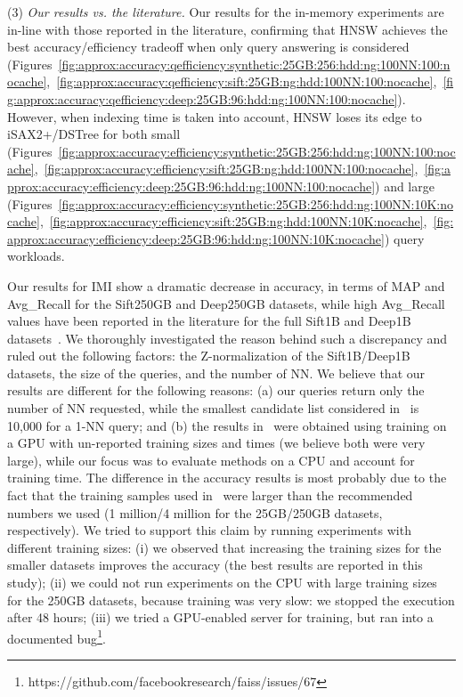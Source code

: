 {%
(3) \emph{Our results vs. the literature.}
Our results for the in-memory experiments are in-line with those reported in the literature, confirming that HNSW achieves the best accuracy/efficiency tradeoff when only query answering is considered~\cite{conf/sisap/martin17} (Figures~\ref{fig:approx:accuracy:qefficiency:synthetic:25GB:256:hdd:ng:100NN:100:nocache},~\ref{fig:approx:accuracy:qefficiency:sift:25GB:ng:hdd:100NN:100:nocache},~\ref{fig:approx:accuracy:qefficiency:deep:25GB:96:hdd:ng:100NN:100:nocache}). 
However, when indexing time is taken into account, HNSW loses its edge to iSAX2+/DSTree for both small  (Figures~\ref{fig:approx:accuracy:efficiency:synthetic:25GB:256:hdd:ng:100NN:100:nocache},~\ref{fig:approx:accuracy:efficiency:sift:25GB:ng:hdd:100NN:100:nocache},~\ref{fig:approx:accuracy:efficiency:deep:25GB:96:hdd:ng:100NN:100:nocache}) and large (Figures~\ref{fig:approx:accuracy:efficiency:synthetic:25GB:256:hdd:ng:100NN:10K:nocache},~\ref{fig:approx:accuracy:efficiency:sift:25GB:ng:hdd:100NN:10K:nocache},~\ref{fig:approx:accuracy:efficiency:deep:25GB:96:hdd:ng:100NN:10K:nocache}) query workloads.

Our results for IMI show a dramatic decrease in accuracy, in terms of MAP and Avg\_Recall for the Sift250GB and Deep250GB datasets, while high Avg\_Recall values have been reported in the literature for the full Sift1B and Deep1B datasets~\cite{conf/cvpr/yandex16,url/faiss}. 
We thoroughly investigated the reason behind such a discrepancy and ruled out the following factors: the Z-normalization of the Sift1B/Deep1B datasets, the size of the queries, and the number of NN. 
We believe that our results are different for the following reasons: 
(a) our queries return only the number of NN requested, while the smallest candidate list considered in~\cite{conf/cvpr/yandex16} is 10,000 for a 1-NN query; and (b) the results in~\cite{url/faiss} were obtained using training on a GPU with un-reported training sizes and times (we believe both were very large), while our focus was to evaluate methods on a CPU and account for training time. %
The difference in the accuracy results is most probably due to the fact that the training samples used in~\cite{url/faiss} were larger than the recommended numbers we used (1 million/4 million for the 25GB/250GB datasets, respectively). 
We tried to support this claim by running experiments with different training sizes: 
(i) we observed that increasing the training sizes for the smaller datasets improves the accuracy (the best results are reported in this study); 
(ii) we could not run experiments on the CPU with large training sizes for the 250GB datasets, because training was very slow: we stopped the execution after 48 hours; 
(iii) we tried a GPU-enabled server for training, but ran into a documented bug\footnote{ https://github.com/facebookresearch/faiss/issues/67}. 

}
